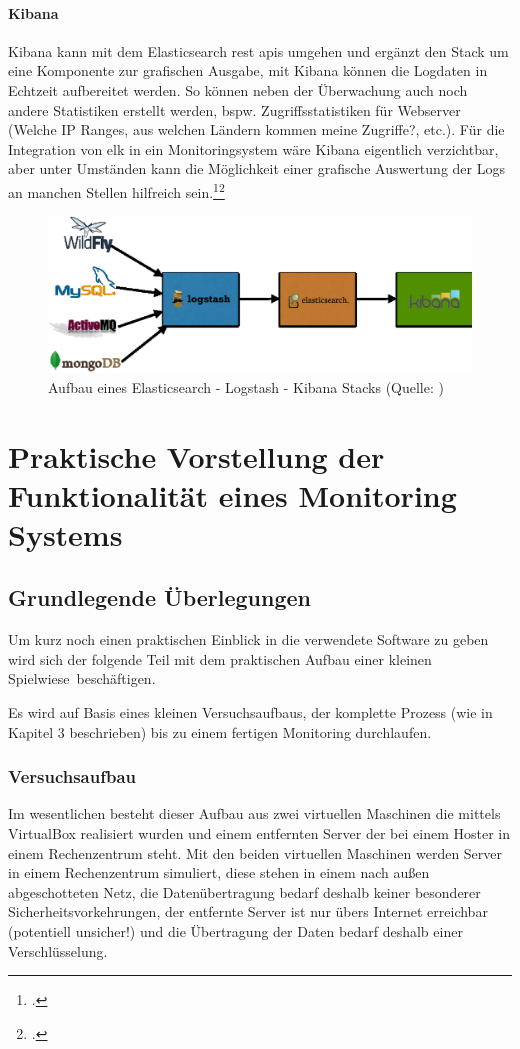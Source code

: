 \documentclass[12pt,a4paper,parskip,listof=totoc,bibliography=totoc]{scrreprt}
\begin{document}
	\subsubsection{Kibana}
	Kibana kann mit dem Elasticsearch \acrshort{rest} \acrshort{api}s umgehen und ergänzt den Stack um eine Komponente zur grafischen Ausgabe, mit Kibana können die Logdaten in Echtzeit aufbereitet werden. So können neben der Überwachung auch noch andere Statistiken erstellt werden, bspw. Zugriffsstatistiken für Webserver (Welche IP Ranges, aus welchen Ländern kommen meine Zugriffe?, etc.). Für die Integration von \acrshort{elk} in ein Monitoringsystem wäre Kibana eigentlich verzichtbar, aber unter Umständen kann die Möglichkeit einer grafische Auswertung der Logs an manchen Stellen hilfreich sein.\footcite{kibana}\footcite{elk2015}
	\begin{figure}
		\centering
		\includegraphics[width=1\textwidth]{pics/elk-stack.eps}
		\caption[Aufbau eines Elasticsearch - Logstash - Kibana Stacks]{Aufbau eines Elasticsearch - Logstash - Kibana Stacks (Quelle: \textcite{elkstackpic})}
		\label{fig:elk}
	\end{figure}
	\clearpage
	
	\chapter{Praktische Vorstellung der Funktionalität eines Monitoring Systems}
	\section{Grundlegende Überlegungen}
	Um kurz noch einen praktischen Einblick in die verwendete Software zu geben wird sich der folgende Teil mit dem praktischen Aufbau einer kleinen \glqq Spielwiese\grqq\ beschäftigen. 
	
	Es wird auf Basis eines kleinen Versuchsaufbaus, der komplette Prozess (wie in Kapitel 3 beschrieben) bis zu einem fertigen Monitoring durchlaufen.
	\subsection{Versuchsaufbau}
	Im wesentlichen besteht dieser Aufbau aus zwei virtuellen Maschinen die mittels VirtualBox realisiert wurden und einem entfernten Server der bei einem Hoster in einem Rechenzentrum steht. Mit den beiden virtuellen Maschinen werden Server in einem Rechenzentrum simuliert, diese stehen in einem nach außen abgeschotteten Netz, die Datenübertragung bedarf deshalb keiner besonderer Sicherheitsvorkehrungen, der entfernte Server ist nur übers Internet erreichbar (potentiell unsicher!) und die Übertragung der Daten bedarf deshalb einer Verschlüsselung.
\end{document}
